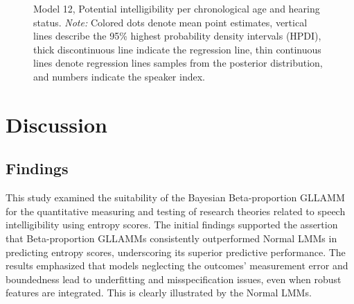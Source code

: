 \documentclass[
  authoryear,
  preprint,
  1p]{elsarticle}
\begin{document}
\label{cell-fig-rq3-intelligibility-model12}
\begin{figure}[H]


\caption{\label{fig-rq3-intelligibility-model12}Model 12, Potential
intelligibility per chronological age and hearing status. \emph{Note:}
Colored dots denote mean point estimates, vertical lines describe the
95\% highest probability density intervals (HPDI), thick discontinuous
line indicate the regression line, thin continuous lines denote
regression lines samples from the posterior distribution, and numbers
indicate the speaker index.}

\end{figure}%

\section{Discussion}\label{sec-discussion}

\subsection{Findings}\label{sec-D-F}

This study examined the suitability of the Bayesian Beta-proportion
GLLAMM for the quantitative measuring and testing of research theories
related to speech intelligibility using entropy scores. The initial
findings supported the assertion that Beta-proportion GLLAMMs
consistently outperformed Normal LMMs in predicting entropy scores,
underscoring its superior predictive performance. The results emphasized
that models neglecting the outcomes' measurement error and boundedness
lead to underfitting and misspecification issues, even when robust
features are integrated. This is clearly illustrated by the Normal LMMs.
\end{document}
